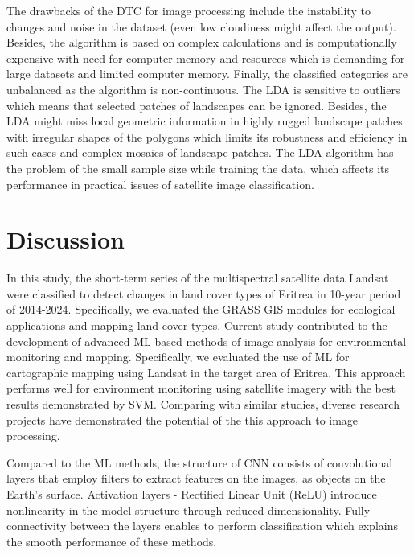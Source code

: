 \documentclass[sn-mathphys-num]{sn-jnl}%
\theoremstyle{thmstyleone}%
\theoremstyle{thmstyletwo}%
\theoremstyle{thmstylethree}%
\begin{document}
The drawbacks of the DTC for image processing include the instability to changes and noise in the dataset (even low cloudiness might affect the output). Besides, the algorithm is based on complex calculations and is computationally expensive with need for computer memory and resources which is demanding for large datasets and limited computer memory. Finally, the classified categories are unbalanced as the algorithm is non-continuous. The LDA{ }is sensitive to outliers which means that selected patches of landscapes can be ignored. Besides, the LDA might miss local geometric information in highly rugged landscape patches with irregular shapes of the polygons which limits its robustness and efficiency in such cases and complex mosaics of landscape patches. The LDA algorithm has the problem of the small sample size while training the data, which affects its performance in practical issues of satellite image classification.


\section{Discussion}
{In this study, the short-term series of the multispectral satellite data Landsat were classified to detect changes in land cover types of Eritrea in 10-year period of 2014-2024. Specifically, we }evaluated the GRASS GIS modules for ecological applications and mapping land cover types. Current study contributed to the development of advanced ML-based methods of image analysis for environmental monitoring and mapping. Specifically, we evaluated the use of ML for cartographic mapping using Landsat in the target area of Eritrea. {This} approach performs well for environment monitoring using satellite imagery with the best {results} demonstrated by SVM. Comparing {with} similar studies, diverse research projects have demonstrated the potential of the this approach to image processing{.} 

{Compared to the ML methods, the structure of CNN consists of convolutional layers that employ filters to extract features on the images, as objects on the Earth's surface. Activation layers - Rectified Linear Unit (ReLU) introduce nonlinearity in the model structure through reduced dimensionality. Fully connectivity between the layers enables to perform classification which explains the smooth performance of these methods. }
\end{document}

